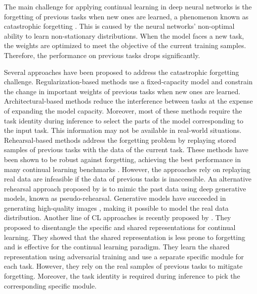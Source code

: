 \documentclass[letterpaper]{article} %
\begin{document}
The main challenge for applying continual learning in deep neural networks is the forgetting of previous tasks when new ones are learned, a phenomenon known as catastrophic forgetting \cite{mccloskey1989catastrophic}. This is caused by the neural networks' non-optimal ability to learn non-stationary distributions. When the model faces a new task, the weights are optimized to meet the objective of the current training samples. Therefore, the performance on previous tasks drops significantly.

Several approaches have been proposed to address the catastrophic forgetting challenge. Regularization-based methods use a fixed-capacity model and constrain the change in important weights of previous tasks when new ones are learned. Architectural-based methods reduce the interference between tasks at the expense of expanding the model capacity. Moreover, most of these methods require the task identity during inference to select the parts of the model corresponding to the input task. This information may not be available in real-world situations. Rehearsal-based methods address the forgetting problem by replaying stored samples of previous tasks with the data of the current task. These methods have been shown to be robust against forgetting, achieving the best performance in many continual learning benchmarks \cite{VanDeVen2018a,Hsu18_EvalCL}. However, the approaches rely on replaying real data are infeasible if the data of previous tasks is inaccessible. An alternative rehearsal approach proposed by \cite{mocanu2016online, shin2017continual} is to mimic the past data using deep generative models, known as pseudo-rehearsal. Generative models have succeeded in generating high-quality images \cite{bao2017cvae,miyato2018cgans,guo2019auto}, making it possible to model the real data distribution. Another line of CL approaches is recently proposed by \cite{ebrahimi2020adversarial}. They proposed to disentangle the specific and shared representations for continual learning. They showed that the shared representation is less prone to forgetting and is effective for the continual learning paradigm. They learn the shared representation using adversarial training and use a separate specific module for each task. However, they rely on the real samples of previous tasks to mitigate forgetting. Moreover, the task identity is required during inference to pick the corresponding specific module.
\end{document}
